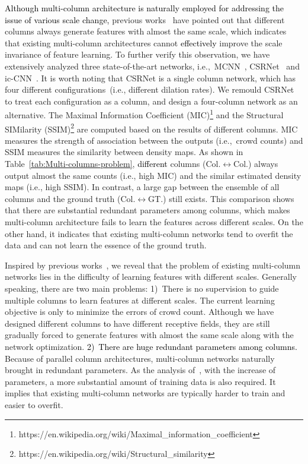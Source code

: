 \documentclass[sigconf]{acmart}
\newcommand{\ljx}[1]{\textcolor{black}{#1}}
\newcommand{\czq}[1]{\textcolor{black}{#1}}
\begin{document}
\czq{Although multi-column architecture is naturally employed for addressing the issue of various scale change,}
previous works~\cite{CSRNet-18,deep-training-ICCNN-18,deep-pooling-fscale-Defense-18,SPooling-18,iccv-19} have pointed out that different columns always generate features with almost the same scale, which indicates that existing multi-column architectures cannot \ljx{effectively} improve the scale invariance of feature learning.
To further verify this observation, we have extensively analyzed three state-of-the-art networks, i.e.,~MCNN~\cite{MCNN-16}, CSRNet~\cite{CSRNet-18} and ic-CNN~\cite{deep-training-ICCNN-18}.
It is worth noting that CSRNet is a single column network, which has four different configurations~(i.e., different dilation rates).
We remould CSRNet to treat each configuration as a column, and design a four-column network as an alternative.
The Maximal Information Coefficient (MIC)\footnote{https://en.wikipedia.org/wiki/Maximal\_information\_coefficient} and the Structural SIMilarity (SSIM)\footnote{{https://en.wikipedia.org/wiki/Structural\_similarity}} are computed based on the results of different columns.
MIC measures the strength of association between the outputs (i.e.,~crowd counts)
and SSIM measures the similarity between density maps.
As shown in Table~\ref{tab:Multi-columns-problem}, 
\ljx{different }columns (Col.$\leftrightarrow$Col.) always output almost the same counts (i.e., high MIC) and the similar estimated density maps (i.e., high SSIM).
In contrast, a large gap between the ensemble of all columns and the ground truth (Col.$\leftrightarrow$GT.) still exists.
This comparison shows that there are substantial redundant parameters among columns, which makes multi-column architecture fails to learn the features across different scales.
On the other hand, it indicates that existing multi-column networks tend to overfit the data and can not learn the essence of the ground truth. 

Inspired by previous works~\cite{deep-training-ICCNN-18,CSRNet-18,deep-pooling-fscale-Defense-18}, we reveal that the problem of existing multi-column networks lies in the difficulty of learning features with different scales.
Generally speaking, there are two main problems:
1)~There is no supervision to guide multiple columns to learn features at different scales.
The current learning objective is only to minimize the errors of crowd count. 
Although we have designed different columns \czq{to} have different receptive fields, they are still gradually forced to generate features with almost the same scale along with the network optimization.
\ljx{2)~There are huge redundant parameters among columns.}
Because of parallel column architectures, multi-column networks naturally brought in redundant parameters.
As the analysis of~\cite{over-fitting-14}, with the increase of parameters, a more substantial amount of training data is also required.
It implies that existing multi-column networks are typically harder to train and easier to overfit.
\end{document}
